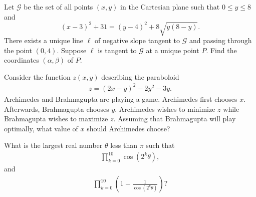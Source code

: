 \documentclass[11pt]{article}
\theoremstyle{definition}
\begin{document}
\begin{question}[name={2015 HMMT, Geometry, \href{https://artofproblemsolving.com/community/c129h1358805p7440443}{Problem 10}}]
	Let $\mathcal{G}$ be the set of all points $(x,y)$ in the Cartesian plane such that $0\le y\le 8$ and$$(x-3)^2+31=(y-4)^2+8\sqrt{y(8-y)}.$$There exists a unique line $\ell$ of negative slope tangent to $\mathcal{G}$ and passing through the point $(0,4)$. Suppose $\ell$ is tangent to $\mathcal{G}$ at a unique point $P$. Find the coordinates $(\alpha, \beta)$ of $P$.
\end{question}



%	





\begin{question}[name={2015 HMMT, Guts, Problem 4}]
	Consider the function $z(x,y)$ describing the paraboloid
	\begin{align*}
		z = (2x-y)^2 - 2y^2 - 3y.
	\end{align*}
	Archimedes and Brahmagupta are playing a game. Archimedes first chooses $x$. Afterwards, Brahmagupta chooses $y$. Archimedes wishes to minimize $z$ while Brahmagupta wishes to maximize $z$. Assuming that Brahmagupta will play optimally, what value of $x$ should Archimedes choose?
\end{question}


%	





\begin{question}[name={2015 HMMT, Guts, Problem 20}]
	What is the largest real number $\theta$ less than $\pi$ such that
	\begin{align*}
		\prod_{k=0}^{10} \cos\left(2^k\theta\right),
	\end{align*}
	and
	\begin{align*}
		\prod_{k=0}^{10} \left(1 + \frac{1}{\cos(2^k\theta)}\right)?
	\end{align*}
\end{question}


%	
\end{document}
